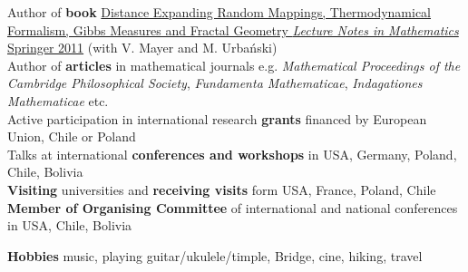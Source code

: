 \documentclass[a4paper, twoside]{scrreprt}
\begin{document}
\noindent\llap{\FA \faBook\ \ }Author of \textbf{book} \href{http://www.amazon.com/Distance-Expanding-Thermodynamical-Formalism-Mathematics/dp/3642236499/ref=sr_1_1?s=books&ie=UTF8&qid=1410309067&sr=1-1}{Distance Expanding Random Mappings, Thermodynamical Formalism, Gibbs Measures and Fractal Geometry \textit{Lecture Notes in Mathematics} Springer 2011} (with V. Mayer and M. Urbański)\\
\noindent\llap{\FA \faPencil\ \ }Author of \textbf{articles} in 
mathematical journals e.g. 
\textit{Mathematical Proceedings of the Cambridge Philosophical Society}, \textit{Fundamenta Mathematicae}, \textit{Indagationes Mathematicae} etc.\\
\noindent\llap{\FA \faBeaker\ \ }Active participation in international research \textbf{grants} financed by European Union, Chile or Poland\\
\noindent\llap{\FA \faBullhorn\ \ }Talks at international 
\textbf{conferences and workshops} in USA, Germany, Poland, 
Chile, Bolivia\\
\noindent\llap{\FA \faExchange\ \ }\textbf{Visiting} 
universities and \textbf{receiving visits} form USA, France, Poland, Chile\\
\noindent\llap{\FA \faCalendar\ \ }\textbf{Member of Organising Committee} of international and national conferences in USA, Chile, Bolivia

\noindent\makebox[\linewidth]{\rule{\textwidth}{0.4pt}}

\vspace{0.1cm}


\noindent
\begin{minipage}{0.9\textwidth}
   \noindent\llap{\FA \faMusic\ \ }\textbf{Hobbies} music, playing guitar/ukulele/timple, Bridge, cine, hiking, travel\\
\end{minipage}\hfill
\end{document}
